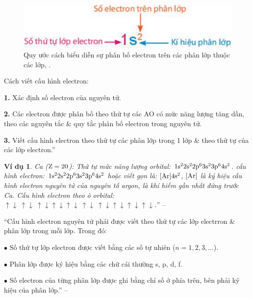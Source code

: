 \documentclass{article}
\numberwithin{equation}{section}
\newtheorem{vidu}{Ví dụ}[section]
\begin{document}
\begin{figure}[h]
	\centering
	\includegraphics[scale=0.15]{quy_uoc_cach_bieu_dien_su_phan_bo_electron_tren_cac_phan_lop_thuoc_cac_lop}
	\caption{Quy ước cách biểu diễn sự phân bố electron trên các phân lớp thuộc các lớp, \cite[p. 32]{SGK_Hoa_Hoc_10_Chan_Troi_Sang_Tao}.}
\end{figure}
Cách viết cấu hình electron:
\begin{enumerate*}
	\item[\textbf{1.}] Xác định số electron của nguyên tử.
	\item[\textbf{2.}] Các electron được phân bố theo thứ tự các AO có mức năng lượng tăng dần, theo các nguyên tắc \& quy tắc phân bố electron trong nguyên tử.
	\item[\textbf{3.}] Viết cấu hình electron theo thứ tự các phân lớp trong 1 lớp \& theo thứ tự của các lớp electron.''
\end{enumerate*}

\begin{vidu}
	Ca ($\rm Z = 20$): Thứ tự mức năng lượng orbital: $\rm 1s^22s^22p^63s^23p^64s^2$. cấu hình electron: $\rm 1s^22s^22p^63s^23p^64s^2$ hoặc viết gọn là: $\rm[Ar]4s^2$, $\rm[Ar]$ là ký hiệu cấu hình electron nguyên tử của nguyên tố argon, là khí hiếm gần nhất đứng trước Ca. Cấu hình electron theo ô orbital: $\boxed{\uparrow\downarrow}\ \boxed{\uparrow\downarrow}\ \boxed{\uparrow\downarrow}\boxed{\uparrow\downarrow}\boxed{\uparrow\downarrow}\ \boxed{\uparrow\downarrow}\ \boxed{\uparrow\downarrow}\boxed{\uparrow\downarrow}\boxed{\uparrow\downarrow}\boxed{\uparrow\downarrow}$.'' -- \cite[p. 32]{SGK_Hoa_Hoc_10_Chan_Troi_Sang_Tao}
\end{vidu}
``Cấu hình electron nguyên tử phải được viết theo thứ tự các lớp electrron \& phân lớp trong mỗi lớp. Trong đó:
\begin{enumerate*}
	\item[$\bullet$] Số thứ tự lớp electron được viết bằng các số tự nhiên ($n = 1,2,3,\ldots$).
	\item[$\bullet$] Phân lớp được ký hiệu bằng các chữ cái thường s, p, d, f.
	\item[$\bullet$] Số electron của từng phân lớp được ghi bằng chỉ số ở phía trên, bên phải ký hiệu của phân lớp.'' -- \cite[p. 32]{SGK_Hoa_Hoc_10_Chan_Troi_Sang_Tao}
\end{enumerate*}
\end{document}

